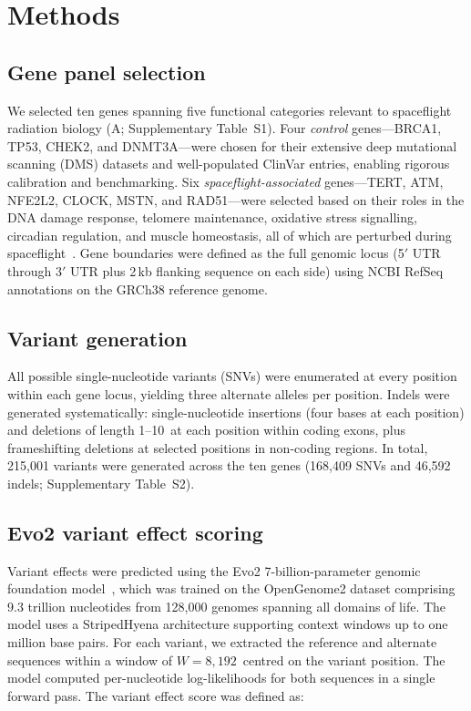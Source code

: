 \section{Methods}
\label{sec:methods}

\subsection{Gene panel selection}
\label{sec:methods_genes}

We selected ten genes spanning five functional categories relevant to spaceflight
radiation biology (A; Supplementary Table~S1). Four
\textit{control} genes---BRCA1, TP53, CHEK2, and DNMT3A---were chosen for their
extensive deep mutational scanning (DMS) datasets and well-populated ClinVar
entries, enabling rigorous calibration and benchmarking. Six
\textit{spaceflight-associated} genes---TERT, ATM, NFE2L2, CLOCK, MSTN, and
RAD51---were selected based on their roles in the DNA damage response, telomere
maintenance, oxidative stress signalling, circadian regulation, and muscle
homeostasis, all of which are perturbed during
spaceflight~\cite{Rutter_2024,daSilveira_2020,Twins_2019}. Gene boundaries were
defined as the full genomic locus (5$'$ UTR through 3$'$ UTR plus 2\,kb
flanking sequence on each side) using NCBI RefSeq annotations on the GRCh38
reference genome.

\subsection{Variant generation}
\label{sec:methods_variants}

All possible single-nucleotide variants (SNVs) were enumerated at every
position within each gene locus, yielding three alternate alleles per position.
Indels were generated systematically: single-nucleotide insertions (four bases
at each position) and deletions of length 1--10\,\bp{} at each position within
coding exons, plus frameshifting deletions at selected positions in non-coding
regions. In total, 215,001 variants were generated across the ten genes
(168,409 SNVs and 46,592 indels; Supplementary Table~S2).

\subsection{Evo2 variant effect scoring}
\label{sec:methods_scoring}

Variant effects were predicted using the Evo2 7-billion-parameter genomic
foundation model~\cite{Evo2_2026}, which was trained on the OpenGenome2 dataset
comprising 9.3 trillion nucleotides from 128,000 genomes spanning all domains of
life. The model uses a StripedHyena architecture supporting context windows up to
one million base pairs. For each variant, we extracted the reference and alternate
sequences within a window of $W = 8{,}192$\,\bp{} centred on the variant
position. The model computed per-nucleotide log-likelihoods for both sequences in
a single forward pass. The variant effect score was defined as:

